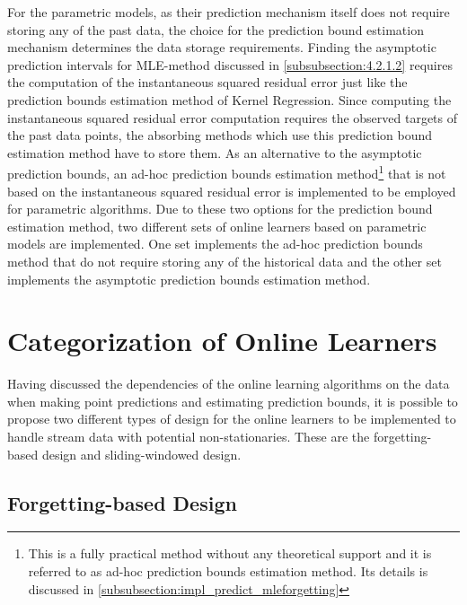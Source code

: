 For the parametric models, as their prediction mechanism itself does not require storing any of the past data, the choice for the prediction bound estimation mechanism determines the data storage requirements. Finding the asymptotic prediction intervals for MLE-method discussed in \ref{subsubsection:4.2.1.2} requires the computation of the instantaneous squared residual error just like the prediction bounds estimation method of Kernel Regression. Since computing the instantaneous squared residual error computation requires the observed targets of the past data points, the absorbing methods which use this prediction bound estimation method have to store them. As an alternative to the asymptotic prediction bounds, an ad-hoc prediction bounds estimation method\footnote{This is a fully practical method without any theoretical support and it is referred to as ad-hoc prediction bounds estimation method. Its details is discussed in \ref{subsubsection:impl_predict_mleforgetting}} that is not based on the instantaneous squared residual error is implemented to be employed for parametric algorithms. Due to these two options for the prediction bound estimation method, two different sets of online learners based on parametric models are implemented. One set implements the ad-hoc prediction bounds method that do not require storing any of the historical data and the other set implements the asymptotic prediction bounds estimation method.

\section{Categorization of Online Learners}

Having discussed the dependencies of the online learning algorithms on the data when making point predictions and estimating prediction bounds, it is possible to propose two different types of design for the online learners to be implemented to handle stream data with potential non-stationaries. These are the forgetting-based design and sliding-windowed design.

\subsection{Forgetting-based Design}

